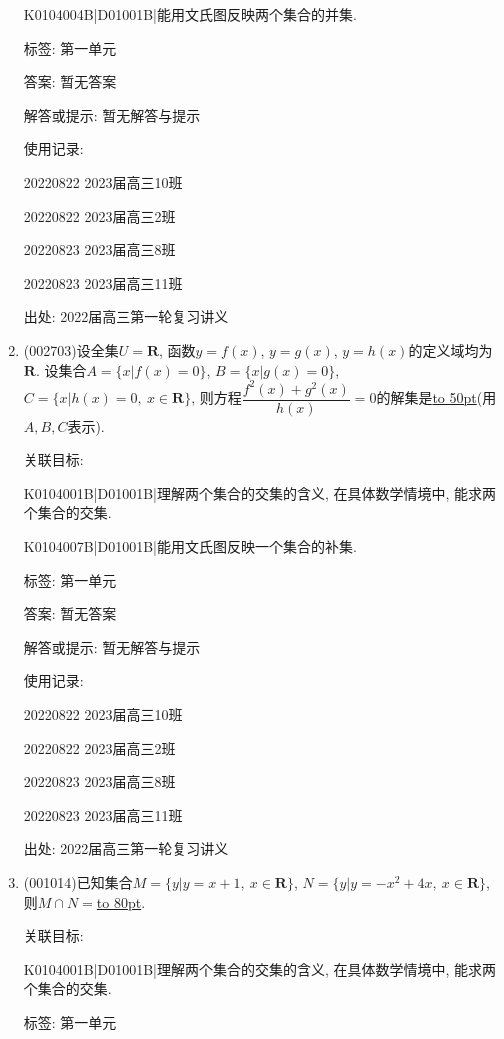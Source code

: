 \documentclass[10pt,a4paper]{article}
\newcommand{\blank}[1]{\underline{\hbox to #1pt{}}}
\begin{document}
\begin{enumerate}[1.]
K0104004B|D01001B|能用文氏图反映两个集合的并集.



标签: 第一单元

答案: 暂无答案

解答或提示: 暂无解答与提示

使用记录:

20220822	2023届高三10班	

20220822	2023届高三2班	

20220823	2023届高三8班	

20220823	2023届高三11班	


出处: 2022届高三第一轮复习讲义
\item { (002703)}设全集$U=\mathbf{R}$, 函数$y=f(x)$, $y=g(x)$, $y=h(x)$的定义域均为$\mathbf{R}$. 设集合$A=\{x|f(x)=0\}$, $B=\{x|g(x)=0\}$, $C=\{x|h(x)=0, \ x\in \mathbf{R}\}$, 则方程$\dfrac{f^2(x)+g^2(x)}{h(x)}=0$的解集是\blank{50}(用$A,B,C$表示).


关联目标:

K0104001B|D01001B|理解两个集合的交集的含义, 在具体数学情境中, 能求两个集合的交集.

K0104007B|D01001B|能用文氏图反映一个集合的补集.



标签: 第一单元

答案: 暂无答案

解答或提示: 暂无解答与提示

使用记录:

20220822	2023届高三10班	

20220822	2023届高三2班	

20220823	2023届高三8班	

20220823	2023届高三11班	


出处: 2022届高三第一轮复习讲义
\item { (001014)}已知集合$M=\{y|y=x+1, \ x \in \mathbf{R}\}$, $N=\{y|y=-x^2+4x,\  x \in \mathbf{R}\}$,
则$M \cap N=$\blank{80}.


关联目标:

K0104001B|D01001B|理解两个集合的交集的含义, 在具体数学情境中, 能求两个集合的交集.



标签: 第一单元


\end{enumerate}
\end{document}
